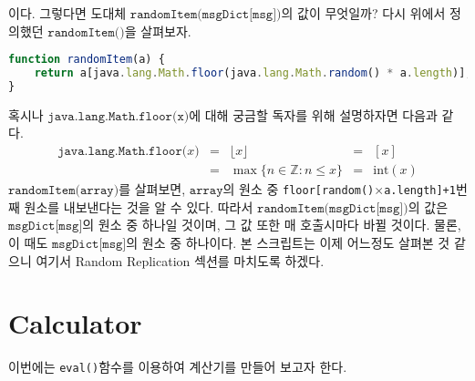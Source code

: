 \documentclass[10pt,a4paper,final]{book}
\begin{document}
이다.
그렇다면 도대체 $\texttt{randomItem(msgDict[msg])}$의 값이 무엇일까? 다시 위에서 정의했던 $\texttt{randomItem()}$을 살펴보자.
\begin{lstlisting}[language=JavaScript,escapeinside=~~, caption={$\texttt{randomItem(array)}$}]
function randomItem(a) {
    return a[java.lang.Math.floor(java.lang.Math.random() * a.length)];
}
\end{lstlisting}
혹시나 $\texttt{java.lang.Math.floor(x)}$에 대해 궁금할 독자를 위해 설명하자면 다음과 같다.
\[
\begin{matrix}
\texttt{java.lang.Math.floor(}x\texttt{)} &=& \lfloor x\rfloor &=& [x]\\
       &=& \max\{n\in \mathbb {Z} \colon n\leq x\} &=& \text{int}(x)
\end{matrix}
\]
$\texttt{randomItem(array)}$를 살펴보면, $\texttt{array}$의 원소 중 \texttt{floor[random()$\times$a.length]+1}번째 원소를
내보낸다는 것을 알 수 있다. 따라서 $\texttt{randomItem(msgDict[msg])}$의 값은 $\texttt{msgDict[msg]}$의 원소 중
하나일 것이며, 그 값 또한 매 호출시마다 바뀔 것이다. 물론, 이 때도 $\texttt{msgDict[msg]}$의 원소 중 하나이다. 본 스크립트는 이제
어느정도 살펴본 것 같으니 여기서 Random Replication 섹션를 마치도록 하겠다.
\section{Calculator}
이번에는 \texttt{eval()}함수를 이용하여 계산기를 만들어 보고자 한다.
\end{document}
